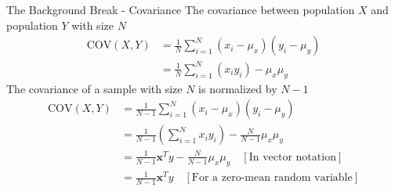 \begin{frame}{The Background Break - Covariance}
The covariance between population $X$ and population $Y$ with size $N$
    \begin{align}
       \text{COV} (X, Y) & = \frac{1}{N} \sum_{i=1}^{N} (x_i - \mu_x)(y_i - \mu_y)\nonumber\\ & = \frac{1}{N} \sum_{i=1}^{N} (x_i y_i) - \mu_x \mu_y \nonumber
    \end{align}
The covariance of a sample with size $N$ is normalized by $N - 1$
    \begin{align}
     \text{COV} (X, Y) & = \frac{1}{N - 1} \sum_{i=1}^{N} (x_i - \mu_x)(y_i - \mu_y)\nonumber \\ &= \frac{1}{N - 1} \left( \sum_{i=1}^{N} x_i y_i \right) - \frac{N}{N - 1} \mu_x \mu_y \nonumber\\
     & = \frac{1}{N - 1}{\mathbf{x}^T y - \frac{N}{N - 1} \mu_x \mu_y}\nonumber \quad [\text{In vector notation}]\\
     & = \frac{1}{N - 1}\mathbf{x}^T y \quad [\text{For a zero-mean random variable}]\nonumber
     \end{align}
\end{frame}

